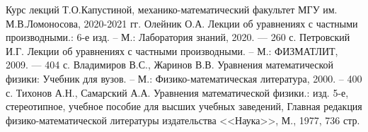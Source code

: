\begin{thebibliography}{}
		Курс лекций Т.О.Капустиной, механико-математический факультет МГУ им. М.В.Ломоносова, 2020-2021 гг.
		Олейник О.А. Лекции об уравнениях с частными производными.: 6-е изд. -- М.: Лаборатория знаний, 2020. --- 260 с.
		Петровский И.Г. Лекции об уравнениях с частными производными. -- М.: ФИЗМАТЛИТ, 2009. --- 404 с.
		Владимиров В.С., Жаринов В.В. Уравнения математической физики: Учебник для вузов. -- М.: Физико-математическая литература, 2000. -- 400 с.
		Тихонов А.Н., Самарский А.А. Уравнения математической физики.: изд. 5-е, стереотипное, учебное пособие для высших учебных заведений, Главная редакция физико-математической литературы издательства <<Наука>>, М., 1977, 736 стр.
\end{thebibliography}


